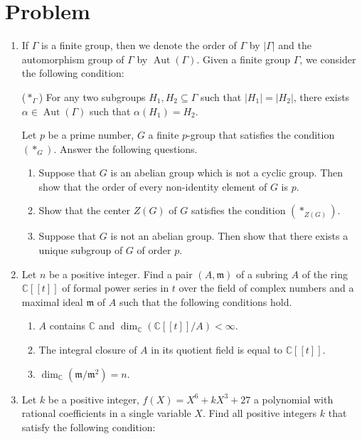 \documentclass{article}
\begin{document}
\section*{Problem}
\begin{enumerate}[label=\fbox{\arabic*}]
  \item %
        If $\Gamma$ is a finite group, then we denote the order of $\Gamma$ by $|\Gamma|$ and the automorphism group of $\Gamma$ by $\operatorname{Aut}(\Gamma)$. Given a finite group $\Gamma$, we consider the following condition:
        
        ($*_\Gamma$) For any two subgroups $H_1, H_2 \subseteq \Gamma$ such that $|H_1| = |H_2|$, there exists $\alpha \in \operatorname{Aut}(\Gamma)$ such that $\alpha(H_1) = H_2$.
        
        Let $p$ be a prime number, $G$ a finite $p$-group that satisfies the condition $(*_G)$. Answer the following questions.
        \begin{enumerate}[label=(\roman*)]
          \item Suppose that $G$ is an abelian group which is not a cyclic group. Then show that the order of every non-identity element of $G$ is $p$.
          \item Show that the center $Z(G)$ of $G$ satisfies the condition $(*_{Z(G)})$.
          \item Suppose that $G$ is not an abelian group. Then show that there exists a unique subgroup of $G$ of order $p$.
        \end{enumerate}

  \item %
        Let $n$ be a positive integer. Find a pair $(A, \mathfrak{m})$ of a subring $A$ of the ring $\mathbb{C}[[t]]$ of formal power series in $t$ over the field of complex numbers and a maximal ideal $\mathfrak{m}$ of $A$ such that the following conditions hold.
        \begin{enumerate}[label=(\alph*)]
          \item $A$ contains $\mathbb{C}$ and $\dim_\mathbb{C}(\mathbb{C}[[t]]/A) < \infty$.
          \item The integral closure of $A$ in its quotient field is equal to $\mathbb{C}[[t]]$.
          \item $\dim_\mathbb{C}(\mathfrak{m}/\mathfrak{m}^2) = n$.
        \end{enumerate}

  \item %
        Let $k$ be a positive integer, $f(X) = X^6 + kX^3 + 27$ a polynomial with rational coefficients in a single variable $X$. Find all positive integers $k$ that satisfy the following condition:
        

\end{enumerate}
\end{document}
